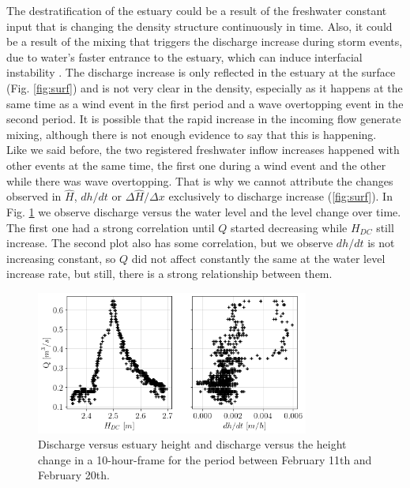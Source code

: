 \documentclass[tesis.tex]{subfiles}
\begin{document}
The destratification of the estuary could be a result of the freshwater constant input that is changing the density structure continuously in time. Also, it could be a result of the mixing that triggers the discharge increase during storm events, due to water's faster entrance to the estuary, which can induce interfacial instability \citep{Katopodes2018}. The discharge increase is only reflected in the estuary at the surface (Fig. \ref{fig:surf}) and is not very clear in the density, especially as it happens at the same time as a wind event in the first period and a wave overtopping event in the second period. It is possible that the rapid increase in the incoming flow generate mixing, although there is not enough evidence to say that this is happening.\\

Like we said before, the two registered freshwater inflow increases happened with other events at the same time, the first one during a wind event and the other while there was wave overtopping. That is why we cannot attribute the changes observed in $\hat{H}$, $dh/dt$ or $\Delta \hat{H}/\Delta x$ exclusively to discharge increase (\ref{fig:surf}). In Fig. \ref{fig:qh} we observe discharge versus the water level and the level change over time. The first one had a strong correlation until $Q$ started decreasing while $H_{DC}$ still increase. The second plot also has some correlation, but we observe $dh/dt$ is not increasing constant, so $Q$ did not affect constantly the same at the water level increase rate, but still, there is a strong relationship between them.\\

\begin{figure}[h!]
    \centering
    \includegraphics[width=0.8\textwidth]{Imagenes/qh.png}
    \caption{Discharge versus estuary height and discharge versus the height change in a 10-hour-frame for the period between February 11th and February 20th.}
    \label{fig:qh}
\end{figure}
\end{document}
